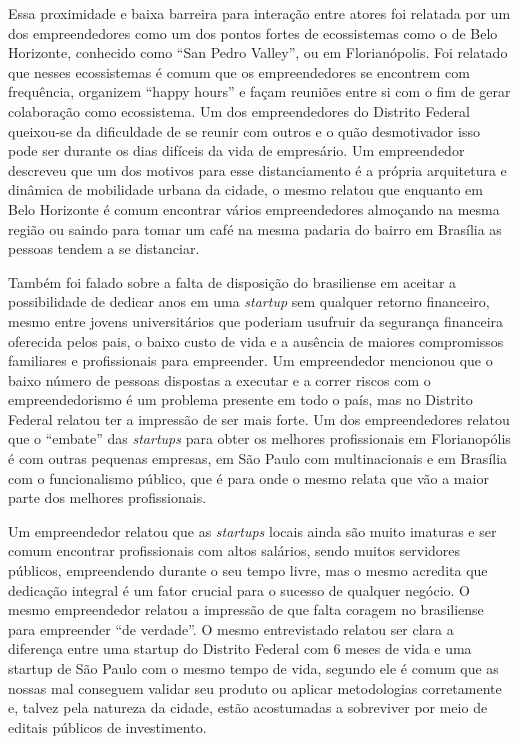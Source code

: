 Essa proximidade e baixa barreira para interação entre atores foi relatada por um dos empreendedores como um dos pontos fortes de ecossistemas como o de Belo Horizonte, conhecido como ``San Pedro Valley'', ou em Florianópolis. Foi relatado que nesses ecossistemas é comum que os empreendedores se encontrem com frequência, organizem ``happy hours'' e façam reuniões entre si com o fim de gerar colaboração como ecossistema. Um dos empreendedores do Distrito Federal queixou-se da dificuldade de se reunir com outros e o quão desmotivador isso pode ser durante os dias difíceis da vida de empresário. Um empreendedor descreveu que um dos motivos para esse distanciamento é a própria arquitetura e dinâmica de mobilidade urbana da cidade, o mesmo relatou que enquanto em Belo Horizonte é comum encontrar vários empreendedores almoçando na mesma região ou saindo para tomar um café na mesma padaria do bairro em Brasília as pessoas tendem a se distanciar.

Também foi falado sobre a falta de disposição do brasiliense em aceitar a possibilidade de dedicar anos em uma \textit{startup} sem qualquer retorno financeiro, mesmo entre jovens universitários que poderiam usufruir da segurança financeira oferecida pelos pais, o baixo custo de vida e a ausência de maiores compromissos familiares e profissionais para empreender. Um empreendedor mencionou que o baixo número de pessoas dispostas a executar e a correr riscos com o empreendedorismo é um problema presente em todo o país, mas no Distrito Federal relatou ter a impressão de ser mais forte. Um dos empreendedores relatou que o ``embate'' das \textit{startups} para obter os melhores profissionais em Florianopólis é com outras pequenas empresas, em São Paulo com multinacionais e em Brasília com o funcionalismo público, que é para onde o mesmo relata que vão a maior parte dos melhores profissionais.

Um empreendedor relatou que as \textit{startups} locais ainda são muito imaturas e ser comum encontrar profissionais com altos salários, sendo muitos servidores públicos, empreendendo durante o seu tempo livre, mas o mesmo acredita que dedicação integral é um fator crucial para o sucesso de qualquer negócio. O mesmo empreendedor relatou a impressão de que falta coragem no brasiliense para empreender ``de verdade''. O mesmo entrevistado relatou ser clara a diferença entre uma startup do Distrito Federal com 6 meses de vida e uma startup de São Paulo com o mesmo tempo de vida, segundo ele é comum que as nossas mal conseguem validar seu produto ou aplicar metodologias corretamente e, talvez pela natureza da cidade, estão acostumadas a sobreviver por meio de editais públicos de investimento.

